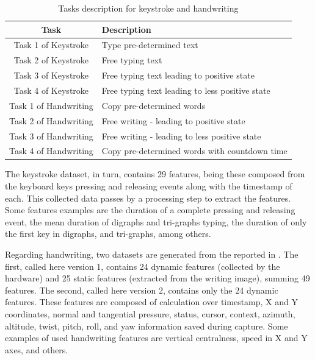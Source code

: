 \documentclass[conference]{IEEEtran}
\begin{document}
\begin{table}[htbp]
    \centering
    \caption{Tasks description for keystroke and handwriting}
    \label{tab:tasks}
    \setlength{\tabcolsep}{3.5pt}
    \begin{tabular}{|c|l|}
        \hline
         \textbf{Task} & \textbf{Description} \\ \hline
         Task 1 of Keystroke & Type pre-determined text \\ \hline
         Task 2 of Keystroke & Free typing text \\ \hline
         Task 3 of Keystroke & Free typing text leading to positive state \\ \hline
         Task 4 of Keystroke & Free typing text leading to less positive state \\ \hline
         Task 1 of Handwriting & Copy pre-determined words \\ \hline
         Task 2 of Handwriting & Free writing - leading to positive state \\ \hline
         Task 3 of Handwriting & Free writing - leading to less positive state \\ \hline
         Task 4 of Handwriting & Copy pre-determined words with countdown time \\ \hline
    \end{tabular}
\end{table}


The keystroke dataset, in turn, contains 29 features, being these composed from the keyboard keys pressing and releasing events along with the timestamp of each.
This collected data passes by a processing step to extract the features. Some features examples are the duration of a complete pressing and releasing event, the mean duration of digraphs and tri-graphs typing, the duration of only the first key in digraphs, and tri-graphs, among others.

Regarding handwriting, two datasets are generated from the reported in \cite{cheng-thesis}. The first, called here version 1, contains 24 dynamic features (collected by the hardware) and 25 static features (extracted from the writing image), summing 49 features. The second, called here version 2, contains only the 24 dynamic features.
These features are composed of calculation over timestamp, X and Y coordinates, normal and tangential pressure, status, cursor, context, azimuth, altitude, twist, pitch, roll, and yaw information saved during capture. Some examples of used handwriting features are vertical centralness, speed in X and Y axes, and others.
\end{document}
